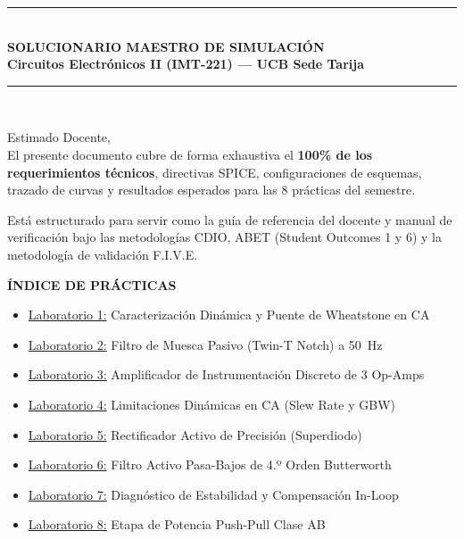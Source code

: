\documentclass[11pt,a4paper,twoside]{article}
\begin{document}
\begin{center}
    \rule{\textwidth}{1.5pt}\\[0.4cm]
    {\huge \textbf{SOLUCIONARIO MAESTRO DE SIMULACIÓN}}\\[0.2cm]
    {\LARGE \textbf{Circuitos Electrónicos II (IMT-221) — UCB Sede Tarija}}\\[0.3cm]
    \rule{\textwidth}{1.5pt}\\[0.5cm]
\end{center}

\noindent Estimado Docente,\\
El presente documento cubre de forma exhaustiva el \textbf{100\% de los requerimientos técnicos}, directivas SPICE, configuraciones de esquemas, trazado de curvas y resultados esperados para las 8 prácticas del semestre. 

Está estructurado para servir como la guía de referencia del docente y manual de verificación bajo las metodologías CDIO, ABET (Student Outcomes 1 y 6) y la metodología de validación F.I.V.E.

\vspace{0.5cm}
\noindent\textbf{ÍNDICE DE PRÁCTICAS}
\begin{itemize}[label=$\bullet$, itemsep=2pt]
    \item \hyperref[lab1]{Laboratorio 1:} Caracterización Dinámica y Puente de Wheatstone en CA
    \item \hyperref[lab2]{Laboratorio 2:} Filtro de Muesca Pasivo (Twin-T Notch) a \qty{50}{\hertz}
    \item \hyperref[lab3]{Laboratorio 3:} Amplificador de Instrumentación Discreto de 3 Op-Amps
    \item \hyperref[lab4]{Laboratorio 4:} Limitaciones Dinámicas en CA (Slew Rate y GBW)
    \item \hyperref[lab5]{Laboratorio 5:} Rectificador Activo de Precisión (Superdiodo)
    \item \hyperref[lab6]{Laboratorio 6:} Filtro Activo Pasa-Bajos de 4.º Orden Butterworth
    \item \hyperref[lab7]{Laboratorio 7:} Diagnóstico de Estabilidad y Compensación In-Loop
    \item \hyperref[lab8]{Laboratorio 8:} Etapa de Potencia Push-Pull Clase AB
\end{itemize}
\end{document}
